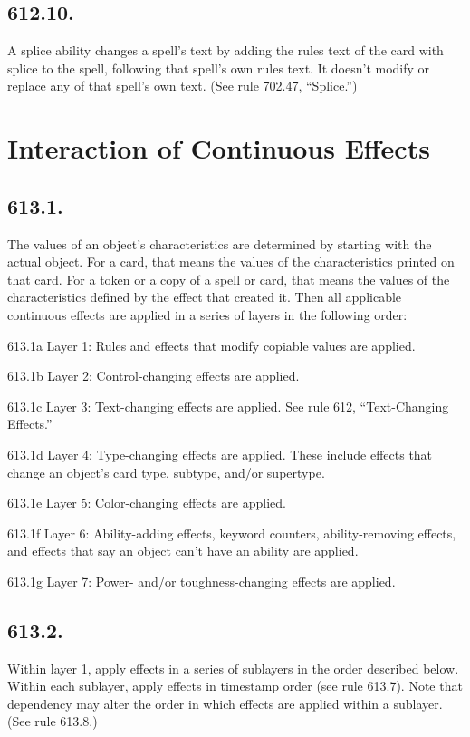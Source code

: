 \subsection*{612.10.}
A splice ability changes a spell’s text by adding the rules text of the card with splice to the spell, following that spell’s own rules text. It doesn’t modify or replace any of that spell’s own text. (See rule 702.47, “Splice.”)

\section{Interaction of Continuous Effects}
\subsection*{613.1.}
The values of an object’s characteristics are determined by starting with the actual object. For a card, that means the values of the characteristics printed on that card. For a token or a copy of a spell or card, that means the values of the characteristics defined by the effect that created it. Then all applicable continuous effects are applied in a series of layers in the following order:

613.1a Layer 1: Rules and effects that modify copiable values are applied.

613.1b Layer 2: Control-changing effects are applied.

613.1c Layer 3: Text-changing effects are applied. See rule 612, “Text-Changing Effects.”

613.1d Layer 4: Type-changing effects are applied. These include effects that change an object’s card type, subtype, and/or supertype.

613.1e Layer 5: Color-changing effects are applied.

613.1f Layer 6: Ability-adding effects, keyword counters, ability-removing effects, and effects that say an object can’t have an ability are applied.

613.1g Layer 7: Power- and/or toughness-changing effects are applied.

\subsection*{613.2.}
Within layer 1, apply effects in a series of sublayers in the order described below. Within each sublayer, apply effects in timestamp order (see rule 613.7). Note that dependency may alter the order in which effects are applied within a sublayer. (See rule 613.8.)

